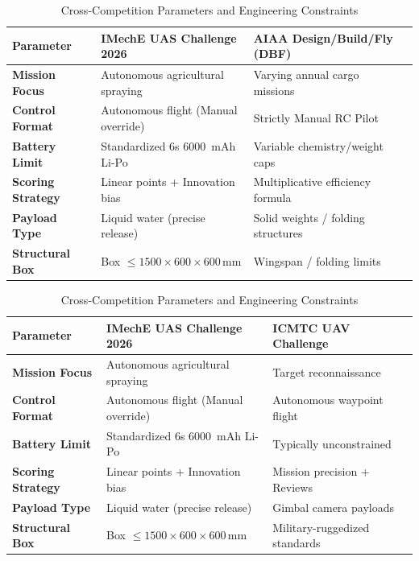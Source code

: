 \documentclass[11pt,a4paper]{article}
\begin{document}
\begin{table}[H]
\centering
\caption{Cross-Competition Parameters and Engineering Constraints}
\label{tab:comparison}
\begin{tabular}{llll}
\toprule
\textbf{Parameter} & \textbf{IMechE UAS Challenge 2026} & \textbf{AIAA Design/Build/Fly (DBF)} \\
\midrule
\textbf{Mission Focus} & Autonomous agricultural spraying & Varying annual cargo missions\\
\textbf{Control Format} & Autonomous flight (Manual override) & Strictly Manual RC Pilot  \\
\textbf{Battery Limit} & Standardized 6s 6000~mAh Li-Po & Variable chemistry/weight caps\\
\textbf{Scoring Strategy} & Linear points + Innovation bias & Multiplicative efficiency formula \\
\textbf{Payload Type} & Liquid water (precise release) & Solid weights / folding structures \\
\textbf{Structural Box} & Box $\le 1500 \times 600 \times 600$\,mm & Wingspan / folding limits  \\
\bottomrule
\end{tabular}
\end{table}

\begin{table}[H]
\centering
\caption{Cross-Competition Parameters and Engineering Constraints}
\label{tab:comparison}
\begin{tabular}{llll}
\toprule
\textbf{Parameter} & \textbf{IMechE UAS Challenge 2026}  & \textbf{ICMTC UAV Challenge} \\
\midrule
\textbf{Mission Focus} & Autonomous agricultural spraying & Target reconnaissance \\
\textbf{Control Format} & Autonomous flight (Manual override)  & Autonomous waypoint flight \\
\textbf{Battery Limit} & Standardized 6s 6000~mAh Li-Po & Typically unconstrained \\
\textbf{Scoring Strategy} & Linear points + Innovation bias  & Mission precision + Reviews \\
\textbf{Payload Type} & Liquid water (precise release) & Gimbal camera payloads \\
\textbf{Structural Box} & Box $\le 1500 \times 600 \times 600$\,mm &  Military-ruggedized standards \\
\bottomrule
\end{tabular}
\end{table}
\end{document}
